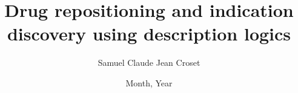 
\title{Drug repositioning and indication discovery
using description logics}

\author{Samuel Claude Jean Croset}





\date{Month, Year}
